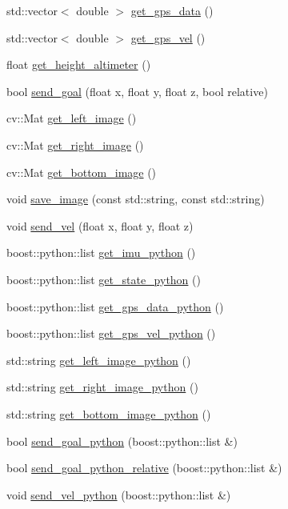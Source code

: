 \begin{DoxyCompactItemize}
\item 
std\-::vector$<$ double $>$ \hyperlink{class_staterobot_a31dcc23cfb620c95e58f3b5ad4bb6b6d}{get\-\_\-gps\-\_\-data} ()
\item 
std\-::vector$<$ double $>$ \hyperlink{class_staterobot_a3a9ee7a49cbb278ffc5f3b201dcae951}{get\-\_\-gps\-\_\-vel} ()
\item 
float \hyperlink{class_staterobot_a3e92b9d6f17c0812e8ed435602d1f717}{get\-\_\-height\-\_\-altimeter} ()
\item 
bool \hyperlink{class_staterobot_a4f1aff1c608a045faa07fa8b9cff4b65}{send\-\_\-goal} (float x, float y, float z, bool relative)
\item 
cv\-::\-Mat \hyperlink{class_staterobot_a5b0323154aa0a19ed82b02cfe7376974}{get\-\_\-left\-\_\-image} ()
\item 
cv\-::\-Mat \hyperlink{class_staterobot_ab1d8f9bfdbd766b96110c0a65fe08f43}{get\-\_\-right\-\_\-image} ()
\item 
cv\-::\-Mat \hyperlink{class_staterobot_a310b2c9315316f96054357ebb705438f}{get\-\_\-bottom\-\_\-image} ()
\item 
void \hyperlink{class_staterobot_a1da31a1c7a8f39878d2511ca86adeb8f}{save\-\_\-image} (const std\-::string, const std\-::string)
\item 
void \hyperlink{class_staterobot_addfc245d53239eed664812a50a916428}{send\-\_\-vel} (float x, float y, float z)
\item 
boost\-::python\-::list \hyperlink{class_staterobot_a3e6bd1883c62204de398342cf8004351}{get\-\_\-imu\-\_\-python} ()
\item 
boost\-::python\-::list \hyperlink{class_staterobot_a91206b2bef7c39193df2eef7b8bae523}{get\-\_\-state\-\_\-python} ()
\item 
boost\-::python\-::list \hyperlink{class_staterobot_ac2fe6ca526d21c1bcb2e284f000759a4}{get\-\_\-gps\-\_\-data\-\_\-python} ()
\item 
boost\-::python\-::list \hyperlink{class_staterobot_aed3a2e6aa076fe6e38f97eb9ab9ef41a}{get\-\_\-gps\-\_\-vel\-\_\-python} ()
\item 
std\-::string \hyperlink{class_staterobot_ab7e02e341f1f3ccfaaa322a2fc1e2caf}{get\-\_\-left\-\_\-image\-\_\-python} ()
\item 
std\-::string \hyperlink{class_staterobot_ab222942f5fe07919fc4999eb600706d1}{get\-\_\-right\-\_\-image\-\_\-python} ()
\item 
std\-::string \hyperlink{class_staterobot_a36d188439ca66b3e56cff58877297945}{get\-\_\-bottom\-\_\-image\-\_\-python} ()
\item 
bool \hyperlink{class_staterobot_abc938e713a748e1803a304e30145e3d1}{send\-\_\-goal\-\_\-python} (boost\-::python\-::list \&)
\item 
bool \hyperlink{class_staterobot_a5ec7a1fdfa9757ddea8c1587e8324f4a}{send\-\_\-goal\-\_\-python\-\_\-relative} (boost\-::python\-::list \&)
\item 
void \hyperlink{class_staterobot_ae47718241f57b27cf4854730cfb50201}{send\-\_\-vel\-\_\-python} (boost\-::python\-::list \&)
\end{DoxyCompactItemize}
